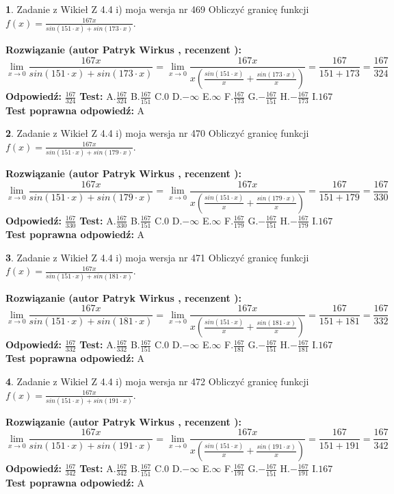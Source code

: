 \documentclass[12pt, a4paper]{article}
\theoremstyle{definition} %
\newtheorem{zad}{}
\newcommand{\zadStart}[1]{\begin{zad}#1\newline}
\newcommand{\zadStop}{\end{zad}}
\newcommand{\rozwStart}[2]{\noindent \textbf{Rozwiązanie (autor #1 , recenzent #2): }\newline}
\newcommand{\rozwStop}{\newline}
\newcommand{\odpStart}{\noindent \textbf{Odpowiedź:}\newline}
\newcommand{\odpStop}{\newline}
\newcommand{\testStart}{\noindent \textbf{Test:}\newline}
\newcommand{\testStop}{\newline}
\newcommand{\kluczStart}{\noindent \textbf{Test poprawna odpowiedź:}\newline}
\newcommand{\kluczStop}{\newline}
\begin{document}
\zadStart{Zadanie z Wikieł Z 4.4 i) moja wersja nr 469}
Obliczyć granicę funkcji $f(x)=\frac{167x}{sin(151\cdot x) +sin(173\cdot x)}$.
\zadStop
\rozwStart{Patryk Wirkus}{}
$$\lim\limits_{x\to 0}\frac{167x}{sin(151\cdot x) +sin(173\cdot x)}=\lim\limits_{x\to 0}\frac{167x}{x(\frac{sin(151\cdot x)}{x}+\frac{sin(173\cdot x)}{x})}=\frac{167}{151+173} = \frac{167}{324}$$
\rozwStop
\odpStart
$\frac{167}{324}$
\odpStop
\testStart
A.$\frac{167}{324}$
B.$\frac{167}{151}$
C.$0$
D.$-\infty$
E.$\infty$
F.$\frac{167}{173}$
G.$-\frac{167}{151}$
H.$-\frac{167}{173}$
I.$167$
\testStop
\kluczStart
A
\kluczStop



\zadStart{Zadanie z Wikieł Z 4.4 i) moja wersja nr 470}
Obliczyć granicę funkcji $f(x)=\frac{167x}{sin(151\cdot x) +sin(179\cdot x)}$.
\zadStop
\rozwStart{Patryk Wirkus}{}
$$\lim\limits_{x\to 0}\frac{167x}{sin(151\cdot x) +sin(179\cdot x)}=\lim\limits_{x\to 0}\frac{167x}{x(\frac{sin(151\cdot x)}{x}+\frac{sin(179\cdot x)}{x})}=\frac{167}{151+179} = \frac{167}{330}$$
\rozwStop
\odpStart
$\frac{167}{330}$
\odpStop
\testStart
A.$\frac{167}{330}$
B.$\frac{167}{151}$
C.$0$
D.$-\infty$
E.$\infty$
F.$\frac{167}{179}$
G.$-\frac{167}{151}$
H.$-\frac{167}{179}$
I.$167$
\testStop
\kluczStart
A
\kluczStop



\zadStart{Zadanie z Wikieł Z 4.4 i) moja wersja nr 471}
Obliczyć granicę funkcji $f(x)=\frac{167x}{sin(151\cdot x) +sin(181\cdot x)}$.
\zadStop
\rozwStart{Patryk Wirkus}{}
$$\lim\limits_{x\to 0}\frac{167x}{sin(151\cdot x) +sin(181\cdot x)}=\lim\limits_{x\to 0}\frac{167x}{x(\frac{sin(151\cdot x)}{x}+\frac{sin(181\cdot x)}{x})}=\frac{167}{151+181} = \frac{167}{332}$$
\rozwStop
\odpStart
$\frac{167}{332}$
\odpStop
\testStart
A.$\frac{167}{332}$
B.$\frac{167}{151}$
C.$0$
D.$-\infty$
E.$\infty$
F.$\frac{167}{181}$
G.$-\frac{167}{151}$
H.$-\frac{167}{181}$
I.$167$
\testStop
\kluczStart
A
\kluczStop



\zadStart{Zadanie z Wikieł Z 4.4 i) moja wersja nr 472}
Obliczyć granicę funkcji $f(x)=\frac{167x}{sin(151\cdot x) +sin(191\cdot x)}$.
\zadStop
\rozwStart{Patryk Wirkus}{}
$$\lim\limits_{x\to 0}\frac{167x}{sin(151\cdot x) +sin(191\cdot x)}=\lim\limits_{x\to 0}\frac{167x}{x(\frac{sin(151\cdot x)}{x}+\frac{sin(191\cdot x)}{x})}=\frac{167}{151+191} = \frac{167}{342}$$
\rozwStop
\odpStart
$\frac{167}{342}$
\odpStop
\testStart
A.$\frac{167}{342}$
B.$\frac{167}{151}$
C.$0$
D.$-\infty$
E.$\infty$
F.$\frac{167}{191}$
G.$-\frac{167}{151}$
H.$-\frac{167}{191}$
I.$167$
\testStop
\kluczStart
A
\kluczStop
\end{document}
